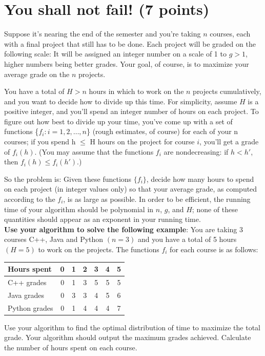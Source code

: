 \documentclass[letter,11pt]{article}
\begin{document}
\section{You shall not fail! (7 points)}
Suppose it’s nearing the end of the semester and you’re taking $n$ courses, each with a final project that still has to be done. Each project will be graded on the following scale: It will be assigned an integer number on a scale of 1 to $g > 1$, higher numbers being better grades. Your goal, of course, is to maximize your average grade on the $n$ projects.

You have a total of $H > n$ hours in which to work on the $n$ projects cumulatively, and you want to decide how to divide up this time. For simplicity, assume $H$ is a positive integer, and you’ll spend an integer number of hours on each project. To figure out how best to divide up your time, you’ve come up with a set of functions \{$f_i :i = 1, 2,\ldots,n$\} (rough estimates, of course) for each of your n courses; if you spend h $\leq$ H hours on the project for course $i$, you’ll get a grade of $f_i(h)$. (You may assume that the functions $f_i$ are nondecreasing: if $h < h'$, then $f_i(h) \leq f_i(h')$.)

So the problem is: Given these functions $\{f_i\}$, decide how many hours to spend on each project (in integer values only) so that your average grade, as computed according to the $f_i$, is as large as possible. In order to be efficient, the running time of your algorithm should be polynomial in $n$, $g$, and $H$; none of these quantities should appear as an exponent in your running time.\\



\textbf{Use your algorithm to solve the following example}:
You are taking 3 courses C++, Java and Python $(n=3)$ and you have a total of 5 hours $(H=5)$ to work on the projects. The functions $f_i$ for each course is as follows:

\begin{center}
\begin{tabular}{|l|c|c|c|c|c|c|}
\hline
Hours spent & 0 & 1 & 2 & 3 & 4 & 5 \\
\hline
C++ grades & 0 & 1 & 3 & 5 & 5 & 5 \\ 
\hline
Java grades & 0 & 3 & 3 & 4 & 5 & 6 \\ 
\hline
Python grades & 0 & 1 & 4 & 4 & 4 & 7 \\ 
\hline
\end{tabular}
\end{center}
Use your algorithm to find the optimal distribution of time to maximize the total grade. Your algorithm should output the maximum grades achieved. Calculate the number of hours spent on each course.
\end{document}
